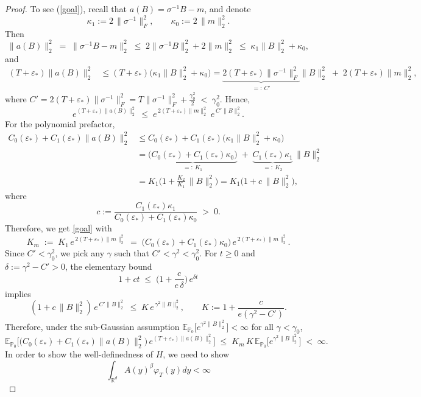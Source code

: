 \documentclass[11pt]{article}
\theoremstyle{definition}
\newcommand{\E}{\mathbb{E}}
\begin{document}
\begin{proof}
To see (\ref{goal}), recall that \(a(B)=\sigma^{-1}B - m\), and denote
\[
\kappa_1 := 2\,\|\sigma^{-1}\|_F^2,\qquad \kappa_0 := 2\,\|m\|_2^2.
\]
Then
$$\|a(B)\|_2^2 \;=\; \|\sigma^{-1}B - m\|_2^2
\;\le\; 2\|\sigma^{-1}B\|_2^2 + 2\|m\|_2^2
\;\le\; \kappa_1 \|B\|_2^2 + \kappa_0,$$
and
\begin{align*}
(T+\varepsilon_*)\|a(B)\|_2^2
&\le (T+\varepsilon_*)\big(\kappa_1 \|B\|_2^2 + \kappa_0\big)
= \underbrace{2(T+\varepsilon_*)\|\sigma^{-1}\|_F^2}_{=:~C'} \|B\|_2^2 \;+\; 2(T+\varepsilon_*)\|m\|_2^2,
\end{align*}
where
$C'= 2(T+\varepsilon_*)\|\sigma^{-1}\|_F^2
= T\|\sigma^{-1}\|_F^2 + \frac{\gamma_0^2}{2} \;<\; \gamma_0^2.$ 
Hence, 
$$e^{(T+\varepsilon_*)\|a(B)\|_2^2}
\;\le\; e^{\,2(T+\varepsilon_*)\|m\|_2^2}\; e^{\,C'\|B\|_2^2}.$$
For the polynomial prefactor, 
\begin{align*}
C_0(\varepsilon_*) + C_1(\varepsilon_*)\|a(B)\|_2^2
&\le C_0(\varepsilon_*) + C_1(\varepsilon_*)\big(\kappa_1 \|B\|_2^2 + \kappa_0\big) \\
&= \underbrace{\big(C_0(\varepsilon_*) + C_1(\varepsilon_*)\kappa_0\big)}_{=:~K_1}
\;+\; \underbrace{C_1(\varepsilon_*)\kappa_1}_{=:~K_2}\,\|B\|_2^2 \\
&= K_1\Big(1 + \frac{K_2}{K_1}\,\|B\|_2^2\Big)
= K_1\big(1 + c\,\|B\|_2^2\big), 
\end{align*}
where
\[
c := \frac{C_1(\varepsilon_*)\kappa_1}{C_0(\varepsilon_*) + C_1(\varepsilon_*)\kappa_0} \;>\; 0 .
\]
Therefore, we get \eqref{goal} with
\[
K_m \;:=\; K_1\, e^{\,2(T+\varepsilon_*)\|m\|_2^2}
\;=\; \big(C_0(\varepsilon_*) + C_1(\varepsilon_*)\kappa_0\big)\, e^{\,2(T+\varepsilon_*)\|m\|_2^2}.
\]
Since \(C' < \gamma_0^2\), we pick any \(\gamma\) such that \(C' < \gamma^2 < \gamma_0^2\).
For \(t\ge 0\) and \(\delta := \gamma^2 - C' > 0\), the elementary bound
\[
1 + c t \;\le\; \Big(1 + \frac{c}{e\,\delta}\Big)\, e^{\delta t}
\]
implies
\[
(1 + c\,\|B\|_2^2)\, e^{\,C'\|B\|_2^2}
\;\le\; K\, e^{\,\gamma^2 \|B\|_2^2},
\qquad K := 1 + \frac{c}{e(\gamma^2 - C')}.
\]
Therefore, under the sub-Gaussian assumption
\(\E_{\mathbb{P}_0}\big[e^{\gamma^2\|B\|_2^2}\big] < \infty\) for all \(\gamma < \gamma_0\),
\[
\E_{\mathbb{P}_0}\!\Big[\bigl(C_0(\varepsilon_*) + C_1(\varepsilon_*)\|a(B)\|_2^2\bigr)\, e^{(T+\varepsilon_*)\|a(B)\|_2^2}\Big]
\;\le\; K_m\,K\,\E_{\mathbb{P}_0}\big[e^{\gamma^2\|B\|_2^2}\big] \;<\; \infty.
\]
In order to show the well-definedness of $H$, we need to show
\begin{equation}\label{CS}
    \int_{\mathbb{R}^d}A(y)^{\beta}\varphi_T(y)dy < \infty

\end{equation}
\end{proof}
\end{document}
